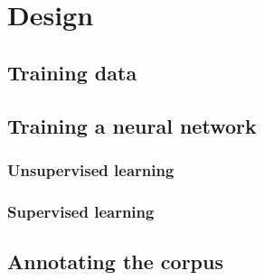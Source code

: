 
\chapter{Design}
\label{chp:design}

\section{Training data}
\label{sec:trainingdata}

\section{Training a neural network}
\label{sec:training-nn}

\subsection{Unsupervised learning}
\label{sec:unsupervised}

\subsection{Supervised learning}
\label{sec:supervised}

\section{Annotating the corpus}
\label{sec:annotating}

